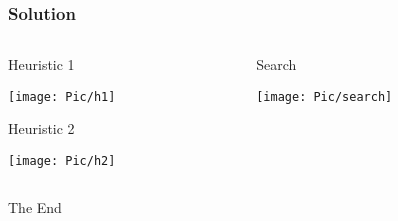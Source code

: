 \documentclass{beamer}
\begin{document}
\begin{frame}
  \frametitle{Solution}
  \begin{columns}
    \begin{column}{.5\linewidth}
      Heuristic 1
      
      \texttt{[image: Pic/h1]}

      Heuristic 2
      
      \texttt{[image: Pic/h2]}
    \end{column}
    \begin{column}{.5\linewidth}
      Search
      
      \texttt{[image: Pic/search]}
    \end{column}
  \end{columns}

\end{frame}

\begin{frame}
  \Huge{\centerline{The End}}
\end{frame}

\end{document}
